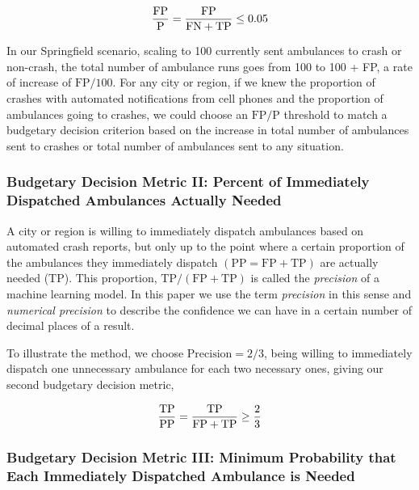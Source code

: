 \begin{equation} \label{eq:budget_1}\hfil
\frac{ \text{FP}}{\text{P}}
=
\frac{ \text{FP}}{\text{FN} + \text{TP}}
\le 0.05
\end{equation}

 In our Springfield scenario, scaling to 100 currently sent ambulances to crash or non-crash, the total number of ambulance runs goes from 100 to 100 + FP, a rate of increase of $\text{FP}/100$.  For any city or region, if we knew the proportion of crashes with automated notifications from cell phones and the proportion of ambulances going to crashes, we could choose an
 $\text{FP}/\text{P}$
 threshold to match a budgetary decision criterion based on the increase in total number of ambulances sent to crashes or total number of ambulances sent to any situation.


\subsubsection{Budgetary Decision Metric II:  Percent of Immediately Dispatched Ambulances Actually Needed}
\label{political_decisions_precision}

A city or region is willing to immediately dispatch ambulances based on automated crash reports, but only up to the point where a certain proportion of the ambulances they immediately dispatch 
$(\text{PP} = \text{FP} + \text{TP})$ 
are actually needed (TP).  This proportion, 
$\text{TP}/(\text{FP} + \text{TP})$ 
is called the {\it precision} of a machine learning model.  In this paper we use the term {\it precision} in this sense and {\it numerical precision} to describe the confidence we can have in a certain number of decimal places of a result.

To illustrate the method, we choose $\text{Precision} = 2/3$, being willing to immediately dispatch one unnecessary ambulance for each two necessary ones, giving our second budgetary decision metric,

\begin{equation} \label{eq:budget_2}\hfil
\frac{ \text{TP}}{\text{PP}}
=
\frac{ \text{TP}}{\text{FP} + \text{TP}}
\ge \frac{2}{3}
\end{equation}

\subsubsection{Budgetary Decision Metric III:  Minimum Probability that Each Immediately Dispatched Ambulance is Needed}
\label{political_decisions_probability}

